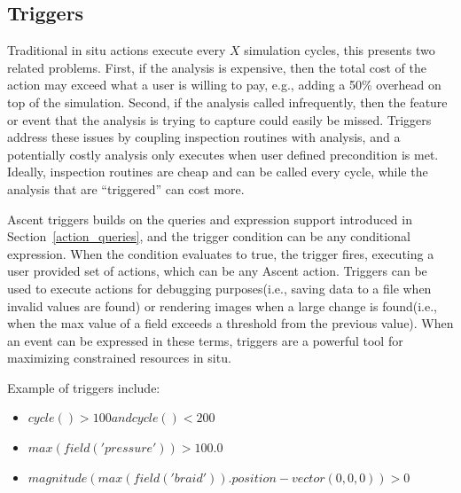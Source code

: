 \subsection{Triggers}
\label{sec:ascent:triggers}
Traditional in situ actions execute every $X$ simulation cycles, this presents
two related problems.
%
First, if the analysis is expensive, then the total cost of the action may exceed
what a user is willing to pay, e.g., adding a 50\% overhead on top of the simulation.
%
Second, if the analysis called infrequently, then the feature or event that the analysis is
trying to capture could easily be missed.
%
Triggers address these issues by coupling inspection routines with analysis, and a
potentially costly analysis only executes when user defined precondition is met.
%
Ideally, inspection routines are cheap and can be called every cycle, while the analysis
that are ``triggered'' can cost more.

Ascent triggers builds on the queries and expression support introduced in
Section~\ref{action_queries}, and the trigger condition can be any conditional
expression.
%
When the condition evaluates to true, the trigger fires, executing a user provided
set of actions, which can be any Ascent action.
%
Triggers can be used to execute actions for debugging purposes(i.e., saving data to
a file when invalid values are found) or rendering images when a large
change is found(i.e., when the max value of a field exceeds a threshold from the
previous value).
%
When an event can be expressed in these terms, triggers are a powerful tool for
maximizing constrained resources in situ.

Example of triggers include:
\begin{itemize}
\item $cycle() > 100 and cycle() < 200$
\item $max(field('pressure')) > 100.0$
\item $magnitude(max(field('braid')).position - vector(0,0,0)) > 0$
\end{itemize}
